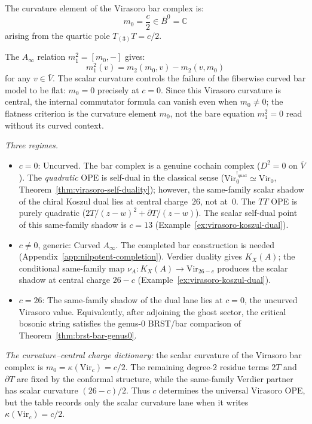 \begin{computation}[Curvature element and \texorpdfstring{$c=0$}{c=0} special value]\label{comp:virasoro-curvature}
The curvature element of the Virasoro bar complex is:
\begin{equation}m_0 = \frac{c}{2} \in \bar{B}^0 = \mathbb{C}
\end{equation}
arising from the quartic pole $T_{(3)}T = c/2$.

The $A_\infty$ relation $m_1^2 = [m_0, -]$ gives:
\begin{equation}
m_1^2(v) = m_2(m_0, v) - m_2(v, m_0)
\end{equation}
for any $v \in \bar{V}$. The scalar curvature controls the failure of
the fiberwise curved bar model to be flat: \(m_0=0\) precisely at
\(c=0\). Since this Virasoro curvature is central, the internal
commutator formula can vanish even when \(m_0\neq0\); the flatness
criterion is the curvature element \(m_0\), not the bare equation
\(m_1^2=0\) read without its curved context.

\emph{Three regimes.}
\begin{itemize}
\item $c = 0$: Uncurved. The bar complex is a genuine cochain complex ($D^2 = 0$ on $\bar{V}$). The \emph{quadratic} OPE is self-dual in the classical sense ($\mathrm{Vir}_0^{!_{\mathrm{quad}}} \simeq \mathrm{Vir}_0$, Theorem~\ref{thm:virasoro-self-duality}); however, the same-family scalar shadow of the chiral Koszul dual lies at central charge~$26$, not at~$0$. The $TT$ OPE is purely quadratic ($2T/(z-w)^2 + \partial T/(z-w)$). The scalar self-dual point of this same-family shadow is $c = 13$ (Example~\ref{ex:virasoro-koszul-dual}).
\item $c \neq 0$, generic: Curved $A_\infty$. The completed bar construction is needed (Appendix~\ref{app:nilpotent-completion}). Verdier duality gives $K_X(A)$; the conditional same-family map $\nu_A\colon K_X(A)\to\mathrm{Vir}_{26-c}$ produces the scalar shadow at central charge $26-c$ (Example~\ref{ex:virasoro-koszul-dual}).
\item $c = 26$: The same-family shadow of the dual lane lies at $c=0$, the uncurved Virasoro value. Equivalently, after adjoining the ghost sector, the critical bosonic string satisfies the genus-$0$ BRST/bar comparison of Theorem~\ref{thm:brst-bar-genus0}.
\end{itemize}

\emph{The curvature--central charge dictionary:} the scalar curvature
of the Virasoro bar complex is
$m_0=\kappa(\mathrm{Vir}_c)=c/2$. The remaining degree-$2$
residue terms $2T$ and $\partial T$ are fixed by the conformal
structure, while the same-family Verdier partner has scalar
curvature $(26-c)/2$. Thus $c$ determines the universal Virasoro
OPE, but the table records only the scalar curvature lane when it
writes $\kappa(\mathrm{Vir}_c)=c/2$.
\end{computation}

